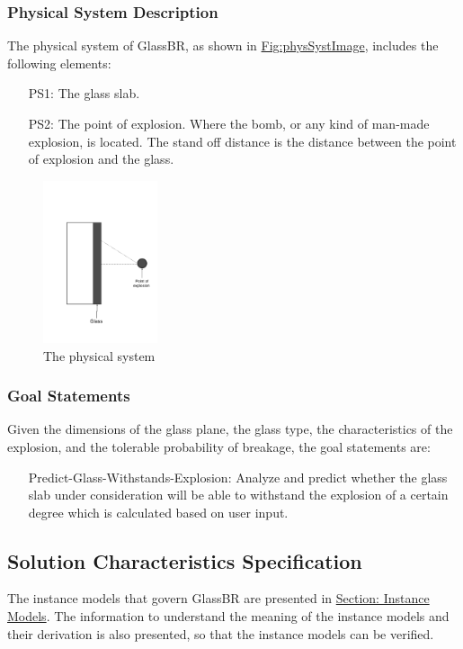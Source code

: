 \documentclass[12pt]{article}
\begin{document}
\subsubsection{Physical System Description}
\label{Sec:PhysSyst}
The physical system of GlassBR, as shown in \hyperref[Figure:physSystImage]{Fig:physSystImage}, includes the following elements:
\begin{itemize}
\item[PS1:]{The glass slab.}
\item[PS2:]{The point of explosion. Where the bomb, or any kind of man-made explosion, is located. The stand off distance is the distance between the point of explosion and the glass.}
\end{itemize}
\begin{figure}
\begin{center}
\includegraphics[width=0.3\textwidth]{../../../datafiles/GlassBR/physicalsystimage.png}
\caption{The physical system}
\label{Figure:physSystImage}
\end{center}
\end{figure}
\subsubsection{Goal Statements}
\label{Sec:GoalStmt}
Given the dimensions of the glass plane, the glass type, the characteristics of the explosion, and the tolerable probability of breakage, the goal statements are:
\begin{itemize}
\item[Predict-Glass-Withstands-Explosion:\phantomsection\label{willBreakGS}]{Analyze and predict whether the glass slab under consideration will be able to withstand the explosion of a certain degree which is calculated based on user input.}
\end{itemize}
\subsection{Solution Characteristics Specification}
\label{Sec:SolCharSpec}
The instance models that govern GlassBR are presented in \hyperref[Sec:IMs]{Section: Instance Models}. The information to understand the meaning of the instance models and their derivation is also presented, so that the instance models can be verified.
\end{document}
